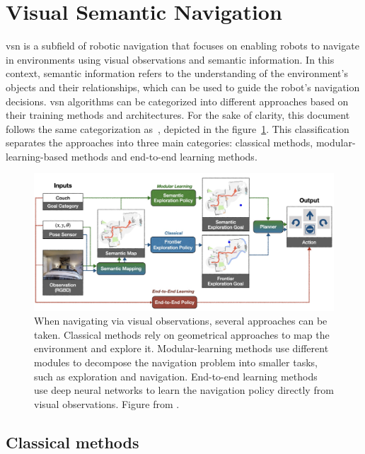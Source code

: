 \section{Visual Semantic Navigation}\label{sec:visual-semantic-navigation}

\acrfull{vsn} is a subfield of robotic navigation that focuses on enabling robots to navigate in environments using visual observations and semantic information.
In this context, semantic information refers to the understanding of the environment's objects and their relationships, which can be used to guide the robot's navigation decisions.
\acrshort{vsn} algorithms can be categorized into different approaches based on their training methods and architectures.
For the sake of clarity, this document follows the same categorization as~\cite{gervet2022}, depicted in the figure~\ref{fig:vsn-categories}.
This classification separates the approaches into three main categories: classical methods, modular-learning-based methods and end-to-end learning methods.

\begin{figure}
    \centering
    \includegraphics[width=\textwidth]{figures/related_work/methods_overview}
    \caption{When navigating via visual observations, several approaches can be taken.
    Classical methods rely on geometrical approaches to map the environment and explore it.
    Modular-learning methods use different modules to decompose the navigation problem into smaller tasks, such as exploration and navigation.
    End-to-end learning methods use deep neural networks to learn the navigation policy directly from visual observations.
    Figure from \cite{gervet2022}.}
    \label{fig:vsn-categories}
\end{figure}

\subsection{Classical methods}\label{subsec:classical-methods}

